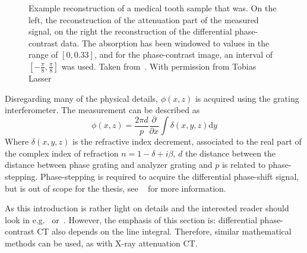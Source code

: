\begin{figure}[H]
	\centering
	\caption{Example reconstruction of a medical tooth sample that was. On the left, the
		reconstruction of the attenuation part of the measured signal, on the right the
		reconstruction of the differential phase-contrast data. The absorption has been
		windowed to values in the range of \([0, 0.33]\), and for the phase-contrast image,
		an interval of \([-\frac{\pi}{8}, \frac{\pi}{8}]\) was used. Taken
		from~\cite{wieczorek_anisotropic_2017}. With permission from Tobias Lasser}
	\label{fig:medical_tooth_sample}
\end{figure}


Disregarding many of the physical details, \(\phi(x, z)\) is acquired using the grating
interferometer. The measurement can be described as
\[ \phi(x, z) = \frac{2\pi d}{p} \frac{\partial}{\partial x}\int \delta(x, y, z)\mathrm{d}y\]
Where \(\delta (x, y, z)\) is the refractive index decrement, associated to the real part of the
complex index of refraction \(n = 1 − \delta + i\beta\), \(d\) the distance between the distance
between phase grating and analyzer grating and \(p\) is related to phase-stepping. Phase-stepping is
required to acquire the differential phase-shift signal, but is out of scope for the thesis, see
~\cite{weitkamp_x-ray_2005} for more information.

As this introduction is rather light on details and the interested reader should look in
e.g.\ \cite{teuffenbach_grating-based_2017} or~\cite{hahn_statistical_2014}. However, the emphasis
of this section is: differential phase-contrast CT also depends on the line integral. Therefore,
similar mathematical methods can be used, as with X-ray attenuation CT\@.


%
%

